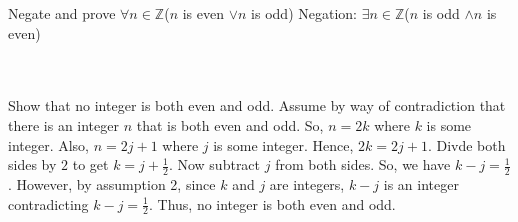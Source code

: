 Negate and prove $\forall n\in \mathbb{Z}$($n$ is even $\lor n$ is odd)  Negation: 
$\exists n\in \mathbb{Z}$($n$ is odd $\land n$ is even)\\\\

\begin{solution}\renewcommand{\qedsymbol}{}\ \\
    Show that no integer is both even and odd. Assume by way of contradiction that there is an integer
    $n$ that is both even and odd. So, $n=2k$ where $k$ is some integer. Also, $n=2j+1$ where $j$ is
    some integer. Hence, $2k=2j+1$. Divde both sides by $2$ to get $k=j+\frac{1}{2}$. Now subtract $j$
    from both sides. So, we have $k-j=\frac{1}{2}$. However, by assumption 2, since $k$ and $j$ are
    integers, $k-j$ is an integer contradicting $k-j=\frac{1}{2}$. Thus, no integer is both even and
    odd.

\end{solution}